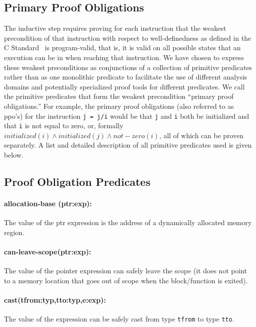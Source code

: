 \documentclass[11pt]{article}
\begin{document}
\subsection{Primary Proof Obligations}

The inductive step requires proving for each instruction that the weakest
precondition of that instruction with respect to well-definedness as
defined in the C Standard~\cite{cstandard} is program-valid, that is,
it is valid on all possible states that an execution can be in when
reaching that instruction. We have chosen to express these weakest
preconditions as conjunctions of a collection of primitive predicates rather than as one
monolithic predicate to facilitate the use of different analysis domains
and potentially specialized proof tools for different predicates.
We call the primitive predicates that form the weakest precondition
``primary proof obligations.'' For example, the primary proof obligations
(also referred to as ppo's) for 
the instruction {\tt j = j/i} would be that {\tt j} and
{\tt i} both be initialized and that {\tt i} is not equal to zero,
or, formally $initialized(i) \wedge initialized(j) \wedge not-zero(i)$,
all of which can be proven separately. A list and detailed description
of all primitive predicates used is given below.

\subsection{Proof Obligation Predicates}

\paragraph{allocation-base (ptr:exp): }
The value of the ptr expression is the address of a 
                dynamically allocated memory region.
                
\paragraph{can-leave-scope(ptr:exp): }
The value of the pointer expression  can safely leave the scope (it does
not point to a memory location that goes out of scope when the block/function
is exited).
                
\paragraph{cast(tfrom:typ,tto:typ,e:exp):}
The value of the expression can be safely cast from type {\tt tfrom}
to type {\tt tto}.
\end{document}
